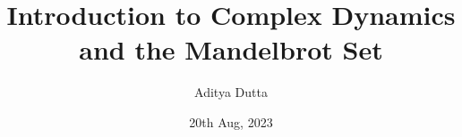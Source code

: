 \documentclass[a4paper,12pt,openany]{scrbook}
\author{Aditya Dutta}
\title{Introduction to Complex Dynamics and the Mandelbrot Set}
\date{20th Aug, 2023}
\theoremstyle{plain}
\theoremstyle{remark}
\begin{document}


\tableofcontents






\medskip

\nocite{*}
\printbibliography
\end{document}
